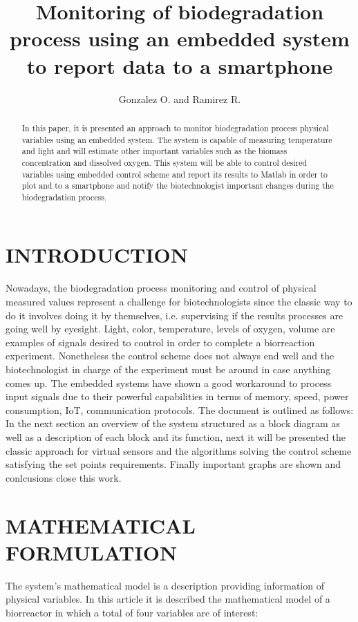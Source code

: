 \documentclass[journal]{IEEEtran}  %
\title{
	Monitoring of biodegradation process using an embedded system to report data to a smartphone
}
\author{
	Gonzalez O. and Ramirez R.%
}
\begin{document}
\maketitle
\thispagestyle{empty}
\pagestyle{empty}


\begin{abstract}

In this paper, it is presented an approach to monitor biodegradation process physical variables using an embedded system. The system is capable of measuring temperature and light and will estimate other important variables such as the biomass concentration and dissolved oxygen. This system will be able to control desired variables using embedded control scheme and report its results to Matlab in order to plot and to a smartphone and notify the biotechnologist important changes during the biodegradation process.

\end{abstract}


\section{INTRODUCTION}
Nowadays, the biodegradation process monitoring and control of physical measured values represent a challenge for biotechnologists since the classic way to do it involves doing it by themselves, i.e. supervising if the results processes are going well by eyesight. Light, color, temperature, levels of oxygen, volume are examples of signals desired to control in order to complete a biorreaction experiment. Nonetheless the control scheme does not always end well and the biotechnologist in charge of the experiment must be around in case anything comes up. The embedded systems have shown a good workaround to process input signals due to their powerful capabilities in terms of memory, speed, power consumption, IoT, communication protocols.
The document is outlined as follows: In the next section an overview of the system structured as a block diagram as well as a description of each block and its function, next it will be presented the classic approach for virtual sensors and the algorithms solving the control scheme satisfying the set points requirements. Finally important graphs are shown and conlcusions close this work.

\section{MATHEMATICAL FORMULATION}
The system's mathematical model is a description providing information of physical variables. In this article it is described the mathematical model of a biorreactor in which a total of four variables are of interest:
\end{document}
